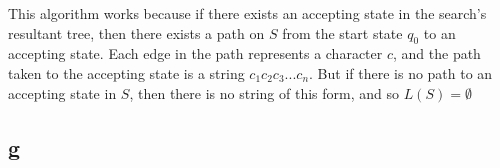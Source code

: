 \documentclass[letterpaper,notitlepage,twoside]{article}
\begin{document}
This algorithm works because if there exists an accepting state in the search's resultant tree, then there exists a path on $S$ from the start state $q_0$ to an accepting state. Each edge in the path represents a character $c$, and the path taken to the accepting state is a string $c_1c_2c_3...c_n$. But if there is no path to an accepting state in $S$, then there is no string of this form, and so $L(S) = \emptyset$
\subsection*{g}
\end{document}
